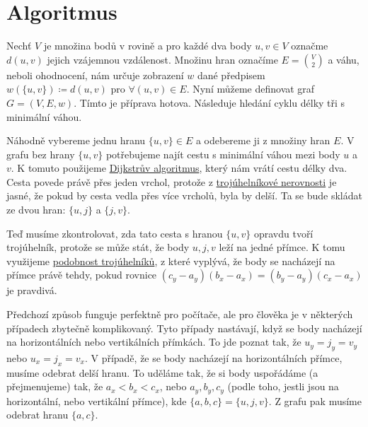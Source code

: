 \section{Algoritmus}
\label{sec:algoritmus}

Nechť $V$ je množina bodů v rovině a pro každé dva body $u, v \in V$ označme $d(u, v)$ jejich vzájemnou vzdálenost. Množinu hran označíme $E = \binom{V}{2}$ a váhu, neboli ohodnocení, nám určuje zobrazení $w$ dané předpisem $w(\{u, v\}) \coloneqq d(u, v)$ pro $\forall (u, v) \in E$. Nyní můžeme definovat graf $G = (V, E, w)$.
Tímto je příprava hotova. Následuje hledání cyklu délky tři s minimální váhou.



Náhodně vybereme jednu hranu $\{u, v\} \in E$ a odebereme ji z množiny hran $E$. V grafu bez hrany $\{u, v\}$ potřebujeme najít cestu s minimální váhou mezi body $u$ a  $v$. K tomuto použijeme \hyperref[sec:dijkstra]{Dijkstrův algoritmus}, který nám vrátí cestu délky dva. Cesta povede právě přes jeden vrchol, protože z \hyperref[definice:trojuhelnikova_nerovnost]{trojúhelníkové nerovnosti} je jasné, že pokud by cesta vedla přes více vrcholů, byla by delší. Ta se bude skládat ze dvou hran: $\{u, j\}$ a $\{j, v\}$.

Teď musíme zkontrolovat, zda tato cesta s hranou $\{u, v\}$ opravdu tvoří trojúhelník, protože se může  stát, že body $u, j, v$ leží na jedné přímce. K tomu využijeme \hyperref[sec:podobnost]{podobnost trojúhelníků}, z které vyplývá, že body se nacházejí na přímce právě tehdy, pokud rovnice $(c_y - a_y)(b_x - a_x) = (b_y - a_y)(c_x - a_x)$ je pravdivá. 

\begin{poznamka}
Předchozí způsob funguje perfektně pro počítače, ale pro člověka je v některých případech zbytečně komplikovaný. Tyto případy nastávají, když se body nacházejí na horizontálních nebo vertikálních přímkách. To jde poznat tak, že $u_y = j_y = v_y$ nebo $u_x = j_x = v_x$.
V případě, že se body nacházejí na horizontálních přímce, musíme odebrat delší hranu. To uděláme tak, že si body uspořádáme (a přejmenujeme) tak, že $a_x<b_x<c_x$, nebo $a_y, b_y, c_y$ (podle toho, jestli jsou na horizontální, nebo vertikální přímce), kde $\{a, b, c\} = \{u, j, v\}$. Z grafu pak musíme odebrat hranu $\{a, c\}$.
\end{poznamka}


